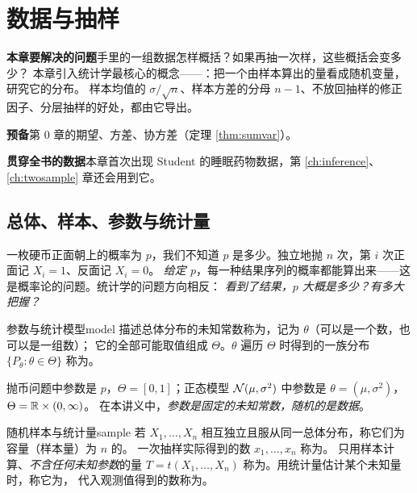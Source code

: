 \chapter{数据与抽样}
\label{ch:sampling}

\begin{chapguide}
\textbf{\heiti 本章要解决的问题}\quad 手里的一组数据怎样概括？如果再抽一次样，这些概括会变多少？
本章引入统计学最核心的概念——：把一个由样本算出的量看成随机变量，研究它的分布。
样本均值的 $\sigma/\sqrt n$、样本方差的分母 $n-1$、不放回抽样的修正因子、分层抽样的好处，都由它导出。\par\smallskip
\textbf{\heiti 预备}\quad 第 0 章的期望、方差、协方差（定理 \ref{thm:sumvar}）。\par\smallskip
\textbf{\heiti 贯穿全书的数据}\quad 本章首次出现 Student 的睡眠药物数据，第 \ref{ch:inference}、\ref{ch:twosample} 章还会用到它。
\end{chapguide}

\section{总体、样本、参数与统计量}

一枚硬币正面朝上的概率为 $p$，我们不知道 $p$ 是多少。独立地抛 $n$ 次，第 $i$ 次正面记 $X_i=1$、反面记 $X_i=0$。
\emph{给定 $p$}，每一种结果序列的概率都能算出来——这是概率论的问题。统计学的问题方向相反：
\emph{看到了结果，$p$ 大概是多少？有多大把握？}

\begin{definition}{参数与统计模型}{model}
描述总体分布的未知常数称为，记为 $\theta$（可以是一个数，也可以是一组数）；
它的全部可能取值组成 $\Theta$。$\theta$ 遍历 $\Theta$ 时得到的一族分布 $\{P_\theta:\theta\in\Theta\}$ 称为。
\end{definition}

抛币问题中参数是 $p$，$\Theta=[0,1]$；正态模型 $\mathcal{N}(\mu,\sigma^2)$ 中参数是 $\theta=(\mu,\sigma^2)$，$\Theta=\mathbb{R}\times(0,\infty)$。
在本讲义中，\emph{参数是固定的未知常数，随机的是数据}。

\begin{definition}{随机样本与统计量}{sample}
若 $X_1,\dots,X_n$ 相互独立且服从同一总体分布，称它们为容量（样本量）为 $n$ 的。
一次抽样实际得到的数 $x_1,\dots,x_n$ 称为。
只用样本计算、\emph{不含任何未知参数}的量 $T=t(X_1,\dots,X_n)$ 称为。用统计量估计某个未知量时，称它为，
代入观测值得到的数称为。
\end{definition}

